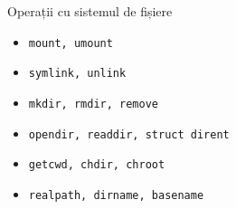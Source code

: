 \documentclass[unknownkeysallowed]{so.cs.pub.ro}
\begin{document}
\begin{frame}{Operații cu sistemul de fișiere}
	\begin{itemize}
		\item \texttt{mount, umount}
		\item \texttt{symlink, unlink}
		\item \texttt{mkdir, rmdir, remove}
		\item \texttt{opendir, readdir, struct dirent}
		\item \texttt{getcwd, chdir, chroot}
		\item \texttt{realpath, dirname, basename}
	\end{itemize}		
\end{frame}
\end{document}
